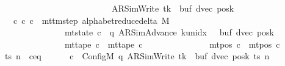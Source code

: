 \begin{isabellebody}
\ \ \ \ \ \ \ \ \ \ \ \ \ \ \ \ \ \ \ \ \ \ \ \ \ \ {\isacharparenleft}{\kern0pt}AR{\isacharunderscore}{\kern0pt}SimWrite{\isacharcomma}{\kern0pt}\ tk{\isacharcomma}{\kern0pt}\ {}{\isacharcomma}{\kern0pt}\ buf{\isacharcomma}{\kern0pt}\ dvec{\isacharcomma}{\kern0pt}\ posk{\isacharparenright}{\kern0pt}{\isachardoublequoteclose}\isanewline
\ \ \ {\isachardoublequoteopen}{\isasymexists}c{\isacharprime}{\kern0pt}{\isacharprime}{\kern0pt}{\isachardot}{\kern0pt}\ {\isacharparenleft}{\kern0pt}c{\isacharprime}{\kern0pt}{\isacharcomma}{\kern0pt}\ c{\isacharprime}{\kern0pt}{\isacharprime}{\kern0pt}{\isacharparenright}{\kern0pt}\ {\isasymin}\ mttm{\isacharunderscore}{\kern0pt}step\ {\isacharparenleft}{\kern0pt}alphabet{\isacharunderscore}{\kern0pt}reduce{\isacharunderscore}{\kern0pt}delta\ M{\isacharparenright}{\kern0pt}\isanewline
\ \ \ \ \ \ \ \ \ \ \ \ \ \ {\isasymand}\ mt{\isacharunderscore}{\kern0pt}state\ c{\isacharprime}{\kern0pt}{\isacharprime}{\kern0pt}\ {\isacharequal}{\kern0pt}\ {\isacharparenleft}{\kern0pt}q{\isacharcomma}{\kern0pt}\ AR{\isacharunderscore}{\kern0pt}SimAdvance{\isacharcomma}{\kern0pt}\ k{\isacharunderscore}{\kern0pt}unidx\ {}{\isacharcomma}{\kern0pt}\ {}{\isacharcomma}{\kern0pt}\ buf{\isacharcomma}{\kern0pt}\ dvec{\isacharcomma}{\kern0pt}\ posk{\isacharparenright}{\kern0pt}\isanewline
\ \ \ \ \ \ \ \ \ \ \ \ \ \ {\isasymand}\ mt{\isacharunderscore}{\kern0pt}tape\ c{\isacharprime}{\kern0pt}{\isacharprime}{\kern0pt}\ {\isacharequal}{\kern0pt}\ mt{\isacharunderscore}{\kern0pt}tape\ c{\isacharprime}{\kern0pt}\isanewline
\ \ \ \ \ \ \ \ \ \ \ \ \ \ {\isasymand}\ mt{\isacharunderscore}{\kern0pt}pos\ c{\isacharprime}{\kern0pt}{\isacharprime}{\kern0pt}\ {\isacharequal}{\kern0pt}\ mt{\isacharunderscore}{\kern0pt}pos\ c{\isacharprime}{\kern0pt}{\isachardoublequoteclose}\isanewline
%
\isadelimproof
%
\endisadelimproof
%
\isatagproof
{}\isamarkupfalse%
\ {\isacharminus}{\kern0pt}\isanewline
\ \ \isamarkupfalse%
\ ts\ n\ \ c{\isacharprime}{\kern0pt}{\isacharunderscore}{\kern0pt}eq{\isacharcolon}{\kern0pt}\isanewline
\ \ \ \ \ \ {\isachardoublequoteopen}c{\isacharprime}{\kern0pt}\ {\isacharequal}{\kern0pt}\ Config\isactrlsub M\ {\isacharparenleft}{\kern0pt}q{\isacharcomma}{\kern0pt}\ AR{\isacharunderscore}{\kern0pt}SimWrite{\isacharcomma}{\kern0pt}\ tk{\isacharcomma}{\kern0pt}\ {}{\isacharcomma}{\kern0pt}\ buf{\isacharcomma}{\kern0pt}\ dvec{\isacharcomma}{\kern0pt}\ posk{\isacharparenright}{\kern0pt}\ ts\ n{\isachardoublequoteclose}\isanewline

\end{isabellebody}
